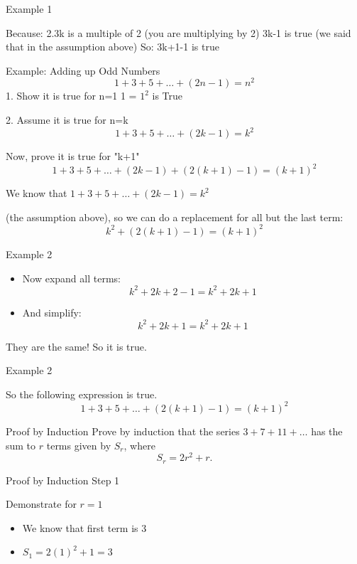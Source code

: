 \documentclass[12pt]{article}
\begin{document}

{Example 1}

Because:
2.3k is a multiple of 2 (you are multiplying by 2)
3k-1 is true (we said that in the assumption above)
So:
3k+1-1 is true


Example: Adding up Odd Numbers
\[1 + 3 + 5 + \ldots + (2n-1) = n^2\]
1. Show it is true for n=1
1 = $1^2$ is True
 
2. Assume it is true for n=k
\[1 + 3 + 5 + \ldots + (2k-1) = k^2\]



 
Now, prove it is true for "k+1"
\[ 1 + 3 + 5 + \ldots + (2k-1) + (2(k+1)-1) = (k+1)^2  \]


 
We know that $1 + 3 + 5 + \ldots + (2k-1) = k^2$ 

(the assumption above), so we can do a replacement for all but the last term:
\[k^2 + (2(k+1)-1) = (k+1)^2\]



{Example 2}

\begin{itemize}
\item Now expand all terms:
\[ k^2 + 2k + 2 - 1 = k^2 + 2k+1 \]
\item And simplify:
\[ k^2 + 2k + 1 = k^2 + 2k + 1 \]
\end{itemize}
They are the same! So it is true.



{Example 2}

So the following expression is true. 
\[ 1 + 3 + 5 + \ldots + (2(k+1)-1) = (k+1)^2 \]



{Proof by Induction}
Prove by induction that the series $3 + 7 + 11 + \ldots$ has the sum to $r$
terms given by $S_r$, where
\[S_r = 2r^2 + r.\]



{Proof by Induction}
Step 1

Demonstrate for $r=1$
\begin{itemize}
\item We know that first term is 3 
\item $S_1  = 2(1)^2 + 1 = 3$
\end{itemize}
\end{document}
